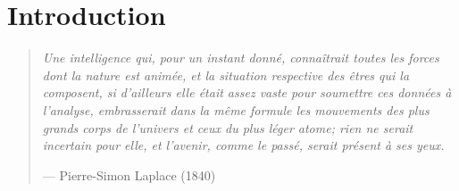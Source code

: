 \chapter{Introduction} \label{chap:introduction}

\begin{quote}
    \textit{Une intelligence qui, pour un instant donné, connaîtrait toutes les forces dont la nature est animée, et la situation respective des êtres qui la composent, si d'ailleurs elle était assez vaste pour soumettre ces données à l'analyse, embrasserait dans la même formule les mouvements des plus grands corps de l'univers et ceux du plus léger atome; rien ne serait incertain pour elle, et l'avenir, comme le passé, serait présent à ses yeux.}

    \begin{flushright}
        --- Pierre-Simon Laplace (1840) \nocite{laplace1840essai}
    \end{flushright}
\end{quote}

\vspace{1em}

